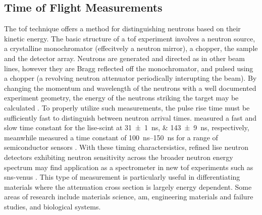 \documentclass[../../../main.tex]{subfiles}
\begin{document}
%
    \subsection{Time of Flight Measurements}%
    \label{sec:chapter-5:moving-forward:time-of-flight}%
    The \gls{tof} technique offers a method for distinguishing neutrons based on their kinetic energy.
    The basic structure of a \gls{tof} experiment involves a neutron source, a crystalline monochromator (effecitvely a neutron mirror), a chopper, the sample and the detector array.
    Neutrons are generated and directed as in other beam lines, however they are Bragg reflected off the monochromator, and pulsed using a chopper (a revolving neutron attenuator periodically interupting the beam).
    By changing the momentum and wavelength of the neutrons with a well documented experiment geometry, the energy of the neutrons striking the target may be calculated \cite{Copley_1992}. 
    To properly utilize such measurements, the pulse rise time must be sufficiently fast to distinguish between neutron arrival times.
    \citeauthor*{Wiggins_2015} measured a fast and slow time constant for the \gls{lise-scint} at \SIlist{31(1); 143(9)}{\nano\second}, respectively, meanwhile \citeauthor*{Hamm_2015} measured a time constant of \SIrange{100}{150}{\nano\second} for a range of semiconductor sensors \cite{Wiggins_2015, Hamm_2015, thesis:Hamm_2018}.
    With these timing charactersistics, refined \gls{lise} neutron detectors exhibiting neutron sensitivity across the broader neutron energy spectrum may find application as a spectrometer in new \gls{tof} experiments such as \gls{sns-venus} \cite{Bilheux_2015}.
    This type of measurement is particularly useful in differentiating materials where the attenuation cross section is largely energy dependent.
    Some areas of research include materials science, \gls{am}, engineering materials and failure studies, and biological systems. 
\end{document}
